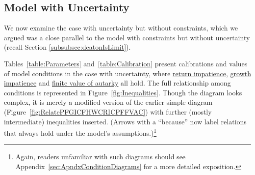 \documentclass[\econtexRoot/BufferStockTheory]{subfiles}
\begin{document}
\hypertarget{model-with-uncertainty}{}
\subsection{Model with Uncertainty}\label{subsec:TheModelUncertainty}

We now examine the case with uncertainty but without constraints, which we argued was a close parallel to the model with constraints but without uncertainty (recall Section \ref{subsubsec:deatonIsLimit}).
\hypertarget{Calibration}{}


\hypertarget{Symbols}{}



Tables~\ref{table:Parameters} and~\ref{table:Calibration} present calibrations and values of model conditions in the case with uncertainty, where \hyperlink{RIC}{return impatience}, \hyperlink{GICRaw}{growth impatience} and \hyperlink{FVAC}{finite value of autarky} all hold.
The full relationship among conditions is represented in Figure~\ref{fig:Inequalities}.
Though the diagram looks complex, it is merely a modified version of the earlier simple diagram (Figure~\ref{fig:RelatePFGICFHWCRICPFFVAC}) with further (mostly intermediate) inequalities inserted.
(Arrows with a ``because'' now label relations that always hold under the model's assumptions.)\footnote{Again, readers unfamiliar with such diagrams should see Appendix~\ref{sec:ApndxConditionDiagrams} for a more detailed exposition.}

\renewcommand{\figName}{Inequalities} 
\renewcommand{\figFile}{\figName} 
\hypertarget{\figFile}{}
\end{document}
